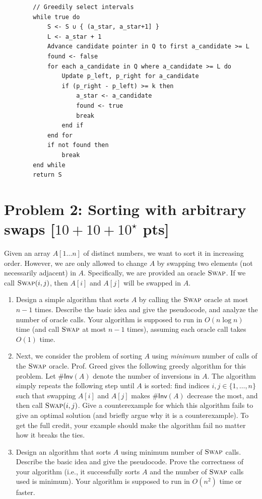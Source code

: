 \documentclass[letterpaper, 11pt]{article}
\newcommand{\1}{\mathds{1}}	%
\theoremstyle{definition}
\newcommand{\problem}[1]{\section*{Problem #1}}
\newenvironment{solution}{{\par\noindent\it Solution.}}{}
\begin{document}
\begin{solution}
\begin{lstlisting}
        // Greedily select intervals
        while true do
            S <- S ∪ { (a_star, a_star+1] }
            L <- a_star + 1
            Advance candidate pointer in Q to first a_candidate >= L
            found <- false
            for each a_candidate in Q where a_candidate >= L do
                Update p_left, p_right for a_candidate
                if (p_right - p_left) >= k then
                    a_star <- a_candidate
                    found <- true
                    break
                end if
            end for
            if not found then
                break
        end while
        return S
    \end{lstlisting}
    
\end{solution}
\newpage

\problem{2: Sorting with arbitrary swaps [$10+10+10^\star$ pts]}

Given an array $A[1 \dots n]$ of distinct numbers, we want to sort it in increasing order.
However, we are only allowed to change $A$ by swapping two elements (not necessarily adjacent) in $A$.
Specifically, we are provided an oracle $\textsc{Swap}$.
If we call $\textsc{Swap}(i,j)$, then $A[i]$ and $A[j]$ will be swapped in $A$.

\begin{enumerate}
    \item Design a simple algorithm that sorts $A$ by calling the $\textsc{Swap}$ oracle at most $n-1$ times.
    Describe the basic idea and give the pseudocode, and analyze the number of oracle calls.
    Your algorithm is supposed to run in $O(n \log n)$ time (and call $\textsc{Swap}$ at most $n-1$ times), assuming each oracle call takes $O(1)$ time.
    \item Next, we consider the problem of sorting $A$ using \textit{minimum} number of calls of the $\textsc{Swap}$ oracle.
    Prof. Greed gives the following greedy algorithm for this problem.
    Let $\#\mathsf{Inv}(A)$ denote the number of inversions in $A$.
    The algorithm simply repeats the following step until $A$ is sorted: find indices $i,j \in \{1,\dots,n\}$ such that swapping $A[i]$ and $A[j]$ makes $\#\mathsf{Inv}(A)$ decrease the most, and then call $\textsc{Swap}(i,j)$.
    Give a counterexample for which this algorithm fails to give an optimal solution (and briefly argue why it is a counterexample).
    To get the full credit, your example should make the algorithm fail no matter how it breaks the ties.
    \item[(c$^\star$)] Design an algorithm that sorts $A$ using minimum number of $\textsc{Swap}$ calls.
    Describe the basic idea and give the pseudocode.
    Prove the correctness of your algorithm (i.e., it successfully sorts $A$ and the number of $\textsc{Swap}$ calls used is minimum).
    Your algorithm is supposed to run in $O(n^2)$ time or faster.
\end{enumerate}
\end{document}
